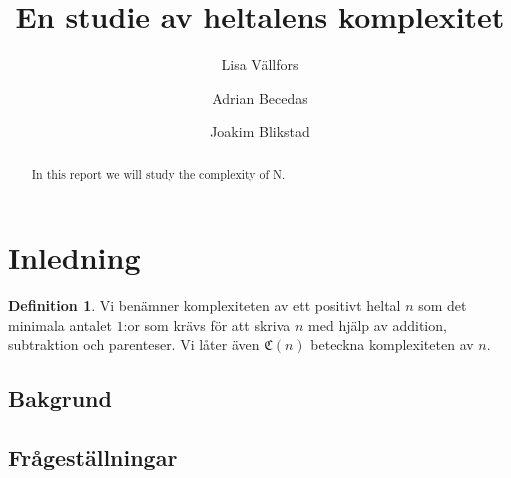 \documentclass[a4paper,titlepage,swedish]{article}
\title{En studie av heltalens komplexitet}
\author{Lisa Vällfors \and Adrian Becedas \and Joakim Blikstad}
\newcommand{\C}[1]{\mathfrak C \left( #1 \right)}
\theoremstyle{definition}
\newtheorem{definition}{Definition}
\begin{document}
\maketitle

\begin{abstract}
    In this report we will study the complexity of N.
\end{abstract}

\tableofcontents 
\newpage

\section{Inledning}

    \begin{definition}
       Vi benämner komplexiteten av ett positivt heltal $n$ som det minimala
       antalet $1$:or som krävs för att skriva $n$ med hjälp av addition,
       subtraktion och parenteser. Vi låter även $\C{n}$ beteckna komplexiteten av
       $n$. 
    \end{definition}

    \subsection{Bakgrund}

    \subsection{Frågeställningar}
        
\end{document}
